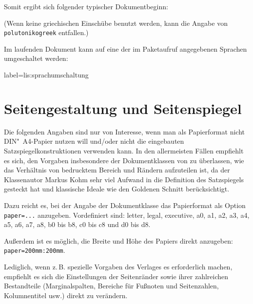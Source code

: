 Somit ergibt sich folgender typischer Dokumentbeginn:


(Wenn keine griechischen Einschübe benutzt werden, kann die Angabe von \lstinline/polutonikogreek/
entfallen.)


Im laufenden Dokument kann auf eine der im Paketaufruf angegebenen Sprachen umgeschaltet werden:

\begin{lfgwcode}{label={lis:sprachumschaltung}}
\end{lfgwcode}


%


\section{Seitengestaltung und Seitenspiegel}
\label{komaskript}
 

Die folgenden Angaben sind nur von Interesse, wenn man als Papierformat nicht DIN"~A4-Papier 
nutzen will und/oder nicht die eingebauten Satzspiegelkonstruktionen verwenden kann.
In den allermeisten Fällen empfiehlt es sich, den Vorgaben insbesondere der Dokumentklassen von
\KOMAScript{} zu überlassen, wie das Verhältnis von bedrucktem Bereich und Rändern aufzuteilen ist,
da der Klassenautor Markus Kohm sehr viel Aufwand in die Definition des Satzspiegels gesteckt hat und
klassische Ideale wie den Goldenen Schnitt berücksichtigt.

Dazu reicht es, bei der Angabe der Dokumentklasse das Papierformat als Option \lstinline/paper=.../ anzugeben.
Vordefiniert sind: letter, legal, executive, a0, a1, a2, a3, a4, a5, a6, a7, a8, b0 bis b8, c0 bis c8 und
d0 bis d8. 
%

Außerdem ist es möglich, die Breite und Höhe des Papiers direkt anzugeben:
\lstinline/paper=200mm:200mm/.

Lediglich, wenn z.\,B. spezielle Vorgaben des Verlages es erforderlich machen, empfiehlt es sich
die Einstellungen der Seitenränder sowie ihrer zahlreichen Bestandteile (Marginalspalten, Bereiche
für Fußnoten und Seitenzahlen, Kolumnentitel usw.) direkt zu verändern.
 

